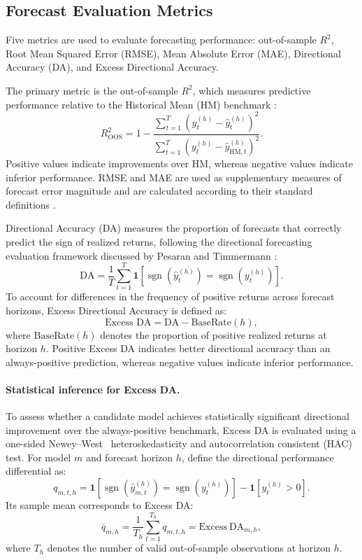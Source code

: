 \documentclass[12pt,twoside]{ord}
\begin{document}
\subsection{Forecast Evaluation Metrics}\label{subsec:eval_metrics}

Five metrics are used to evaluate forecasting performance: out-of-sample $R^2$, Root Mean Squared Error (RMSE), Mean Absolute Error (MAE), Directional Accuracy (DA), and Excess Directional Accuracy.

The primary metric is the out-of-sample $R^2$, which measures predictive performance relative to the Historical Mean (HM) benchmark \cite{campbell2008}:
\begin{equation}\label{eq:oos_r2}
R^2_{\mathrm{OOS}} = 1 - \frac{\sum_{t=1}^T (y_t^{(h)} - \hat{y}_t^{(h)})^2}{\sum_{t=1}^T (y_t^{(h)} - \hat{y}_{\mathrm{HM},t}^{(h)})^2}.
\end{equation}
Positive values indicate improvements over HM, whereas negative values indicate inferior performance. RMSE and MAE are used as supplementary measures of forecast error magnitude and are calculated according to their standard definitions \cite{hodson2022}.

Directional Accuracy (DA) measures the proportion of forecasts that correctly predict the sign of realized returns, following the directional forecasting evaluation framework discussed by Pesaran and Timmermann \cite{pesaran1992}:
\begin{equation}\label{eq:da}
\text{DA} = \frac{1}{T}\sum_{t=1}^T \mathbf{1}\left[\operatorname{sgn}(\hat{y}_t^{(h)}) = \operatorname{sgn}(y_t^{(h)})\right].
\end{equation}
To account for differences in the frequency of positive returns across forecast horizons, Excess Directional Accuracy is defined as:
\begin{equation}\label{eq:excess_da}
\text{Excess DA} = \text{DA} - \text{BaseRate}(h),
\end{equation}
where $\text{BaseRate}(h)$ denotes the proportion of positive realized returns at horizon $h$. Positive Excess DA indicates better directional accuracy than an always-positive prediction, whereas negative values indicate inferior performance.

\paragraph{Statistical inference for Excess DA.} To assess whether a candidate model achieves statistically significant directional improvement over the always-positive benchmark, Excess DA is evaluated using a one-sided Newey--West~\cite{newey1987} heteroskedasticity and autocorrelation consistent (HAC) test. For model $m$ and forecast horizon $h$, define the directional performance differential as:
\[
q_{m,t,h}
=
\mathbf{1}\left[
\operatorname{sgn}(\hat{y}_{m,t}^{(h)})
=
\operatorname{sgn}(y_t^{(h)})
\right]
-
\mathbf{1}\left[y_t^{(h)}>0\right].
\]
Its sample mean corresponds to Excess DA:
\[
\overline{q}_{m,h}
=
\frac{1}{T_h}\sum_{t=1}^{T_h}q_{m,t,h}
=
\mathrm{Excess\ DA}_{m,h},
\]
where $T_h$ denotes the number of valid out-of-sample observations at horizon $h$.
\end{document}
